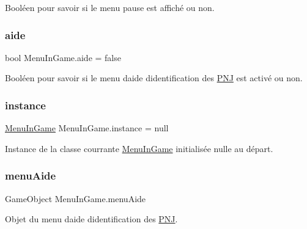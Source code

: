 Booléen pour savoir si le menu pause est affiché ou non. \mbox{\label{class_menu_in_game_adfa7f1418cd36076486043153ec0da7d}} 
\subsubsection{\texorpdfstring{aide}{aide}}
{\footnotesize\ttfamily bool Menu\+In\+Game.\+aide = false\hspace{0.3cm}{\ttfamily [static]}}

Booléen pour savoir si le menu d\textquotesingle{}aide d\textquotesingle{}identification des \mbox{\hyperlink{class_p_n_j}{P\+NJ}} est activé ou non. \mbox{\label{class_menu_in_game_a777dbf06adad3f6dad8d0b90a24443cc}} 
\subsubsection{\texorpdfstring{instance}{instance}}
{\footnotesize\ttfamily \mbox{\hyperlink{class_menu_in_game}{Menu\+In\+Game}} Menu\+In\+Game.\+instance = null\hspace{0.3cm}{\ttfamily [static]}}

Instance de la classe courrante \mbox{\hyperlink{class_menu_in_game}{Menu\+In\+Game}} initialisée nulle au départ. \mbox{\label{class_menu_in_game_a640204616a427a25eb14dd2a8ba91793}} 
\subsubsection{\texorpdfstring{menu\+Aide}{menuAide}}
{\footnotesize\ttfamily Game\+Object Menu\+In\+Game.\+menu\+Aide\hspace{0.3cm}{\ttfamily [private]}}

Objet du menu d\textquotesingle{}aide d\textquotesingle{}identification des \mbox{\hyperlink{class_p_n_j}{P\+NJ}}. \mbox{\label{class_menu_in_game_ae4591a5743c35a0c966763b87511410a}} 

